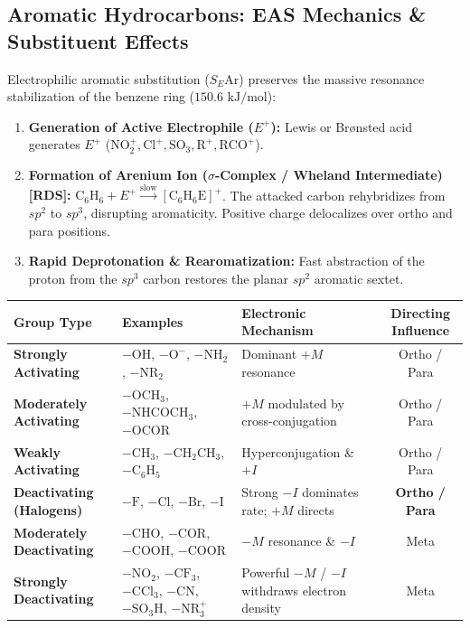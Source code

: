 \documentclass[10pt,twoside,openright]{book}
\begin{document}
\subsection{Aromatic Hydrocarbons: EAS Mechanics \& Substituent Effects}

\begin{conceptbox}
Electrophilic aromatic substitution ($S_E\mathrm{Ar}$) preserves the massive resonance stabilization of the benzene ring ($150.6\text{ kJ/mol}$):
\begin{enumerate}[leftmargin=*]
  \item \textbf{Generation of Active Electrophile ($E^+$):} Lewis or Br{\o}nsted acid generates $E^+$ ($\mathrm{NO_2^+, Cl^+, SO_3, R^+, RCO^+}$).
  \item \textbf{Formation of Arenium Ion ($\sigma$-Complex / Wheland Intermediate) [RDS]:} $\mathrm{C_6H_6} + E^+ \xrightarrow{\text{slow}} [\mathrm{C_6H_6E}]^+$. The attacked carbon rehybridizes from $sp^2$ to $sp^3$, disrupting aromaticity. Positive charge delocalizes over ortho and para positions.
  \item \textbf{Rapid Deprotonation \& Rearomatization:} Fast abstraction of the proton from the $sp^3$ carbon restores the planar $sp^2$ aromatic sextet.
\end{enumerate}
\end{conceptbox}

\begin{formulabox}
{\footnotesize\setlength{\tabcolsep}{2.5pt}
\begin{tabularx}{\linewidth}{|>{\hsize}L|>{\hsize}L|>{\hsize}Y|c|}
\hline
\textbf{Group Type} & \textbf{Examples} & \textbf{Electronic Mechanism} & \textbf{Directing Influence} \\
\hline
\textbf{Strongly Activating} & $-\mathrm{OH}$, $-\mathrm{O^-}$, $-\mathrm{NH_2}$, $-\mathrm{NR_2}$ & Dominant $+M$ resonance & Ortho / Para \\
\hline
\textbf{Moderately Activating} & $-\mathrm{OCH_3}$, $-\mathrm{NHCOCH_3}$, $-\mathrm{OCOR}$ & $+M$ modulated by cross-conjugation & Ortho / Para \\
\hline
\textbf{Weakly Activating} & $-\mathrm{CH_3}$, $-\mathrm{CH_2CH_3}$, $-\mathrm{C_6H_5}$ & Hyperconjugation \& $+I$ & Ortho / Para \\
\hline
\textbf{Deactivating (Halogens)} & $-\mathrm{F}$, $-\mathrm{Cl}$, $-\mathrm{Br}$, $-\mathrm{I}$ & Strong $-I$ dominates rate; $+M$ directs & \textbf{Ortho / Para} \\
\hline
\textbf{Moderately Deactivating} & $-\mathrm{CHO}$, $-\mathrm{COR}$, $-\mathrm{COOH}$, $-\mathrm{COOR}$ & $-M$ resonance \& $-I$ & Meta \\
\hline
\textbf{Strongly Deactivating} & $-\mathrm{NO_2}$, $-\mathrm{CF_3}$, $-\mathrm{CCl_3}$, $-\mathrm{CN}$, $-\mathrm{SO_3H}$, $-\mathrm{NR_3^+}$ & Powerful $-M$ / $-I$ withdraws electron density & Meta \\
\hline
\end{tabularx}}
\end{formulabox}
\end{document}
